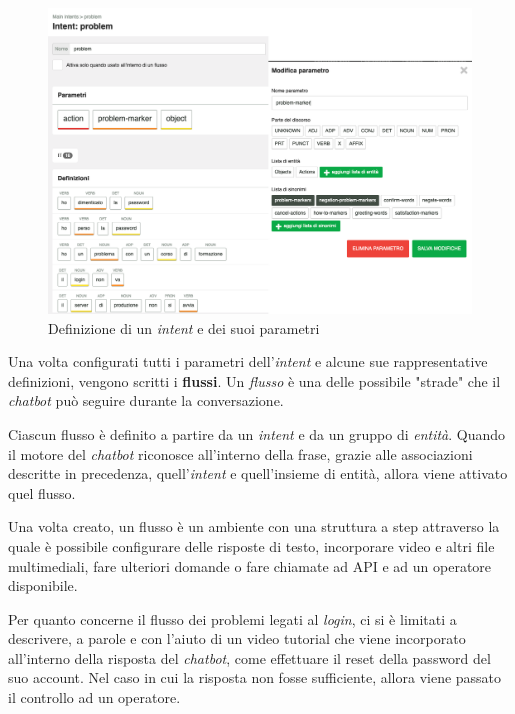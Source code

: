 \begin{figure}
    \centering{}
    \includegraphics*[width=\textwidth]{./img/problem-intent.png}
    \caption{Definizione di un \textit{intent} e dei suoi parametri}
    \label{fig:intent}
\end{figure}

Una volta configurati tutti i parametri dell'\textit{intent} e alcune sue rappresentative definizioni, vengono scritti i \textbf{flussi}.
%
Un \textit{flusso} è una delle possibile "strade" che il \textit{chatbot} può seguire durante la conversazione.

Ciascun flusso è definito a partire da un \textit{intent} e da un gruppo di \textit{entità}. 
%
Quando il motore del \textit{chatbot} riconosce all'interno della frase, grazie alle associazioni descritte in precedenza, quell'\textit{intent} e quell'insieme di entità, allora viene attivato quel flusso.

Una volta creato, un flusso è un ambiente con una struttura a step attraverso la quale è possibile configurare delle risposte di testo, incorporare video e altri file multimediali, fare ulteriori domande o fare chiamate ad API e ad un operatore disponibile.

Per quanto concerne il flusso dei problemi legati al \textit{login}, ci si è limitati a descrivere, a parole e con l'aiuto di un video tutorial che viene incorporato all'interno della risposta del \textit{chatbot}, come effettuare il reset della password del suo account.
%
Nel caso in cui la risposta non fosse sufficiente, allora viene passato il controllo ad un operatore.
